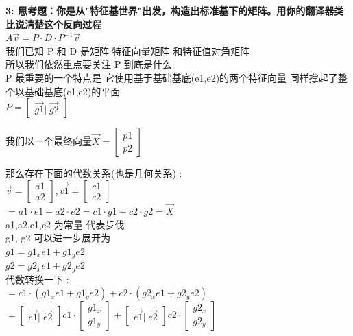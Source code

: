 \documentclass[12pt]{article}
\begin{document}
\begin{flushleft}
    \vspace{0.5em}
    \noindent\textbf{3: 思考题：你是从"特征基世界"出发，构造出标准基下的矩阵。用你的翻译器类比说清楚这个反向过程} \\
    $A\vec{v}  = P\cdot D \cdot P^{-1} \vec{v}$ \\
    我们已知 P 和 D 是矩阵 特征向量矩阵 和特征值对角矩阵 \\
    所以我们依然重点要关注 P 到底是什么: \\
    P 最重要的一个特点是 它使用基于基础基底(e1,e2)的两个特征向量 同样撑起了整个以基础基底(e1,e2)的平面 \\
    $P = \begin{bmatrix}
            \vec{g1} | \; \vec{g2}
        \end{bmatrix}$

    我们以一个最终向量$\vec{X} = \begin{bmatrix}
            p1 \\
            p2
        \end{bmatrix}$

    那么存在下面的代数关系(也是几何关系) : \\
    $\vec{v} = \begin{bmatrix}
            a1 \\
            a2
        \end{bmatrix},\vec{v1} = \begin{bmatrix}
            c1 \\
            c2
        \end{bmatrix} $ \\
    $= a1 \cdot e1 + a2  \cdot e2  = c1 \cdot g1  + c2 \cdot g2  = \vec{X}$ \\
    a1,a2,c1,c2 为常量 代表步伐 \\

    g1, g2 可以进一步展开为  \\
    $g1 = g1_{x}e1 + g1_{y}e2$ \\
    $g2 = g2_{x}e1 + g2_{y}e2$ \\
    代数转换一下 :\\
    $= c1 \cdot (g1_{x}e1 + g1_{y}e2)  + c2 \cdot (g2_{x}e1 + g2_{y}e2)$ \\

    $= \begin{bmatrix}
            \vec{e1} | \; \vec{e2}
        \end{bmatrix} c1 \cdot \begin{bmatrix}
            g1_{x} \\
            g1_{y}
        \end{bmatrix}  + \begin{bmatrix}
            \vec{e1} | \; \vec{e2}
        \end{bmatrix}  c2 \cdot \begin{bmatrix}
            g2_{x} \\
            g2_{y}
        \end{bmatrix} $ \\


\end{flushleft}
\end{document}
